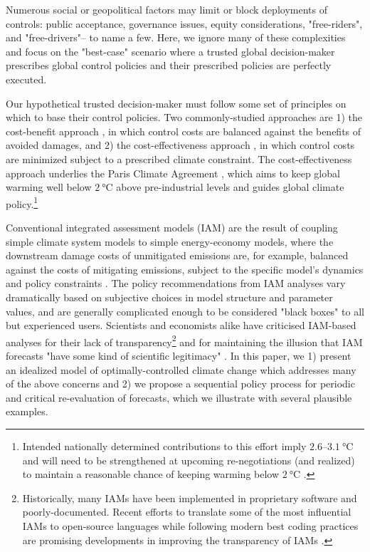 \documentclass[9pt,twocolumn,twoside,lineno]{pnas-new}
\begin{document}
Numerous social or geopolitical factors may limit or block deployments of controls: public acceptance, governance issues, equity considerations, "free-riders", and "free-drivers"– to name a few. Here, we ignore many of these complexities and focus on the "best-case" scenario where a trusted global decision-maker prescribes global control policies and their prescribed policies are perfectly executed.

Our hypothetical trusted decision-maker must follow some set of principles on which to base their control policies. Two commonly-studied approaches are 1) the cost-benefit approach \cite[e.g.][]{nordhaus_optimal_1992}, in which control costs are balanced against the benefits of avoided damages, and 2) the cost-effectiveness approach \cite[e.g.][]{luderer_economic_2013}, in which control costs are minimized subject to a prescribed climate constraint. The cost-effectiveness approach underlies the Paris Climate Agreement \cite{ParisAgreement2015}, which aims to keep global warming well below $\SI{2}{\celsius}$ above pre-industrial levels and guides global climate policy.\footnote{Intended nationally determined contributions to this effort imply $2.6$–$\SI{3.1}{\celsius}$ and will need to be strengthened at upcoming re-negotiations (and realized) to maintain a reasonable chance of keeping warming below $\SI{2}{\celsius}$ \cite{rogelj_paris_2016}.}

Conventional integrated assessment models (IAM) are the result of coupling simple climate system models to simple energy-economy models, where the downstream damage costs of unmitigated emissions are, for example, balanced against the costs of mitigating emissions, subject to the specific model's dynamics and policy constraints \cite[see][for a general overview of IAMs and their utility to date]{weyant_contributions_2017}. The policy recommendations from IAM analyses vary dramatically based on subjective choices in model structure and parameter values, and are generally complicated enough to be considered "black boxes" to all but experienced users. Scientists and economists alike have criticised IAM-based analyses \cite{schneider_integrated_1997, calel_physics_2016, ackerman_limitations_2009} for their lack of transparency\footnote{Historically, many IAMs have been implemented in proprietary software and poorly-documented. Recent efforts to translate some of the most influential IAMs to open-source languages while following modern best coding practices are promising developments in improving the transparency of IAMs \cite{moore_mimi-page_2018}.} and for maintaining the illusion that IAM forecasts "have some kind of scientific legitimacy" \cite{pindyck_use_2017}. In this paper, we 1) present an idealized model of optimally-controlled climate change which addresses many of the above concerns and 2) we propose a sequential policy process for periodic and critical re-evaluation of forecasts, which we illustrate with several plausible examples.
\end{document}

